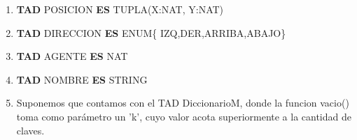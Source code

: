 \documentclass[a4paper,spanish, 10pt]{article}
\begin{document}
\pagestyle{fancy}
\thispagestyle{fancy}
\addtolength{\headheight}{1pt}
\cfoot{\thepage /\pageref{LastPage}}
\renewcommand{\footrulewidth}{0.4pt}

\author{Algoritmos y Estructuras de Datos II, DC, UBA.}
\date{}
\title{}





 	\begin{enumerate}
 	    \item \textbf{TAD} POSICION \textbf{ES} TUPLA(X:NAT, Y:NAT)
	    \item \textbf{TAD} DIRECCION \textbf{ES} ENUM\{ IZQ,DER,ARRIBA,ABAJO\}
	    \item \textbf{TAD} AGENTE \textbf{ES} NAT
	    \item \textbf{TAD} NOMBRE \textbf{ES} STRING
	    \item Suponemos que contamos con el TAD DiccionarioM, donde la funcion vacio() toma como par\'ametro un 'k', cuyo valor acota superiormente a la cantidad de claves.
	\end{enumerate}

%
%
%

\end{document}

